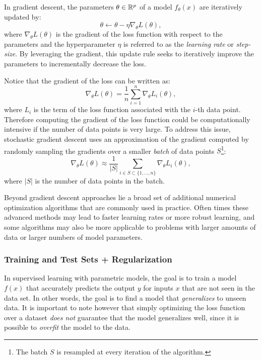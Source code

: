 In gradient descent, the parameters $\theta \in \mathbb{R}^p$  of a model $f_\theta(x)$ are iteratively updated by:
\begin{equation*}
\theta \xleftarrow{} \theta - \eta \nabla_\theta L(\theta),
\end{equation*}
where $\nabla_\theta L(\theta)$ is the gradient of the loss function with respect to the parameters and the hyperparameter $\eta$ is referred to as the \textit{learning rate} or \textit{step-size}. By leveraging the gradient, this update rule seeks to iteratively improve the parameters to incrementally decrease the loss.

Notice that the gradient of the loss can be written as:
\begin{equation*}
\nabla_\theta L(\theta) = \frac{1}{n}\sum_{i=1}^n \nabla_\theta L_i(\theta),   
\end{equation*}
where $L_i$ is the term of the loss function associated with the $i$-th data point.
Therefore computing the gradient of the loss function could be computationally intensive if the number of data points is very large. To address this issue, stochastic gradient descent uses an approximation of the gradient computed by randomly sampling the gradients over a smaller \textit{batch} of data points $S$\footnote{The batch $S$ is resampled at every iteration of the algorithm.}:
\begin{equation*}
\nabla_\theta L(\theta) \approx \frac{1}{\lvert S \rvert} \sum_{i \in S \subset \{1, \dots, n\}} \nabla_\theta L_i(\theta),   
\end{equation*}
where $\lvert S \rvert$ is the number of data points in the batch.

Beyond gradient descent approaches lie a broad set of additional numerical optimization algorithms that are commonly used in practice\cite{KochenderferWheeler2019}. Often times these advanced methods may lead to faster learning rates or more robust learning, and some algorithms may also be more applicable to problems with larger amounts of data or larger numbers of model parameters.

\subsubsection{Training and Test Sets + Regularization} \label{subsubsec:MLreg}
In supervised learning with parametric models, the goal is to train a model $f(x)$ that accurately predicts the output $y$ for inputs $x$ that are not seen in the data set. In other words, the goal is to find a model that \textit{generalizes} to unseen data. It is important to note however that simply optimizing the loss function over a dataset \textit{does not} guarantee that the model generalizes well, since it is possible to \textit{overfit} the model to the data. 

